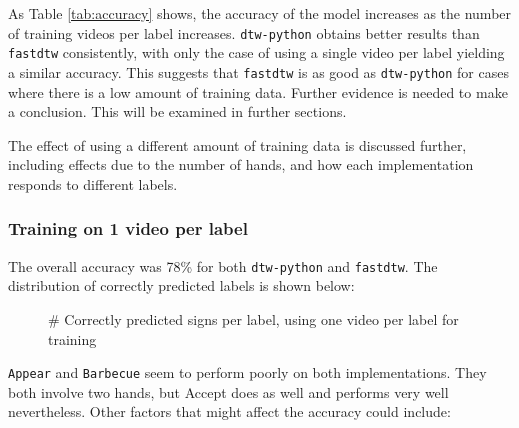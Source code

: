 \documentclass[final,rdr32.tex]{subfiles}
\begin{document}
As Table \ref{tab:accuracy} shows, the accuracy of the model increases as the number of training videos per label increases. \verb|dtw-python| obtains better results than \verb|fastdtw| consistently, with only the case of using a single video per label yielding a similar accuracy. This suggests that \verb|fastdtw| is as good as \verb|dtw-python| for cases where there is a low amount of training data. Further evidence is needed to make a conclusion. This will be examined in further sections.

The effect of using a different amount of training data is discussed further, including effects due to the number of hands, and how each implementation responds to different labels.

\subsubsection{Training on 1 video per label}

The overall accuracy was 78\% for both \verb|dtw-python| and \verb|fastdtw|. The distribution of correctly predicted labels is shown below:

\begin{figure}[H]
    \begin{center}
    \end{center}
    \caption{\# Correctly predicted signs per label, using one video per label for training}
    \label{bar:one}
\end{figure}

\verb|Appear| and \verb|Barbecue| seem to perform poorly on both implementations. They both involve two hands, but Accept does as well and performs very well nevertheless. Other factors that might affect the accuracy could include:
\end{document}
